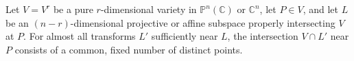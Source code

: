 Let $V = V^r$ be a pure $r$-dimensional variety in $\mathbb{P}^n(\mathbb{C})$ or $\mathbb{C}^n$, let $P \in V$, and let $L$ be an $(n-r)$-dimensional projective or affine subspace properly intersecting $V$ at $P$. For almost all transforms $L'$ sufficiently near $L$, the intersection $V \cap L'$ near $P$ consists of a common, fixed number of distinct points.
